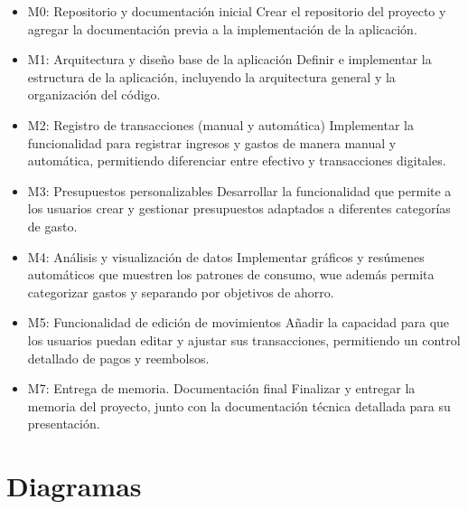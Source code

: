 \begin{itemize}
    \item M0: Repositorio y documentación inicial
    Crear el repositorio del proyecto y agregar la documentación previa a la implementación de la aplicación.

    \item M1: Arquitectura y diseño base de la aplicación
    Definir e implementar la estructura de la aplicación, incluyendo la arquitectura general y la organización del código.

    \item M2: Registro de transacciones (manual y automática)
    Implementar la funcionalidad para registrar ingresos y gastos de manera manual y automática, permitiendo diferenciar entre efectivo y transacciones digitales.

    \item M3: Presupuestos personalizables
    Desarrollar la funcionalidad que permite a los usuarios crear y gestionar presupuestos adaptados a diferentes categorías de gasto.

    \item M4: Análisis y visualización de datos
    Implementar gráficos y resúmenes automáticos que muestren los patrones de consumo, wue además permita categorizar gastos y separando por objetivos de ahorro.

    \item M5: Funcionalidad de edición de movimientos
    Añadir la capacidad para que los usuarios puedan editar y ajustar sus transacciones, permitiendo un control detallado de pagos y reembolsos.

    \item M7: Entrega de memoria. Documentación final
    Finalizar y entregar la memoria del proyecto, junto con la documentación técnica detallada para su presentación.

\end{itemize}

\section{Diagramas}

